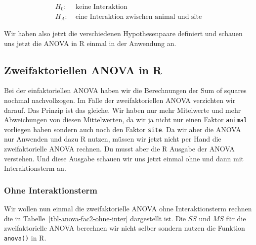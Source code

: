 \documentclass[
  letterpaper,
  DIV=11,
  oneside]{scrreport}
\begin{document}
\begin{align*}
H_0: &\; \mbox{keine Interaktion}\\
H_A: &\; \mbox{eine Interaktion zwischen animal und site}
\end{align*}

Wir haben also jetzt die verschiedenen Hypothesenpaare definiert und
schauen uns jetzt die ANOVA in R einmal in der Anwendung an.

\hypertarget{zweifaktoriellen-anova-in-r}{%
\subsection{Zweifaktoriellen ANOVA in
R}\label{zweifaktoriellen-anova-in-r}}

Bei der einfaktoriellen ANOVA haben wir die Berechnungen der Sum of
squares nochmal nachvollzogen. Im Falle der zweifaktoriellen ANOVA
verzichten wir darauf. Das Prinzip ist das gleiche. Wir haben nur mehr
Mitelwerte und mehr Abweichungen von diesen Mittelwerten, da wir ja
nicht nur einen Faktor \texttt{animal} vorliegen haben sondern auch noch
den Faktor \texttt{site}. Da wir aber die ANOVA nur Anwenden und dazu R
nutzen, müssen wir jetzt nicht per Hand die zweifaktorielle ANOVA
rechnen. Du musst aber die R Ausgabe der ANOVA verstehen. Und diese
Ausgabe schauen wir uns jetzt einmal ohne und dann mit Interaktionsterm
an.

\hypertarget{ohne-interaktionsterm}{%
\subsubsection{Ohne Interaktionsterm}\label{ohne-interaktionsterm}}

Wir wollen nun einmal die zweifaktorielle ANOVA ohne Interaktionsterm
rechnen die in Tabelle~\ref{tbl-anova-fac2-ohne-inter} dargestellt ist.
Die \(SS\) und \(MS\) für die zweifaktorielle ANOVA berechnen wir nicht
selber sondern nutzen die Funktion \texttt{anova()} in R.
\end{document}
